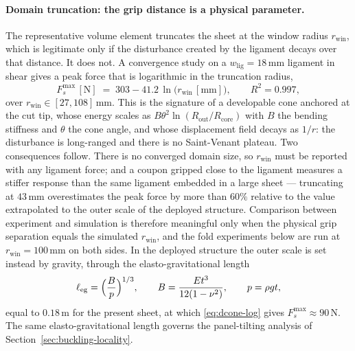 \documentclass[pdflatex,sn-mathphys-num]{sn-jnl}%
\theoremstyle{thmstyleone}%
\theoremstyle{thmstyletwo}%
\theoremstyle{thmstylethree}%
\newcommand{\wlig}{w_{\mathrm{lig}}}
\begin{document}
\paragraph{Domain truncation: the grip distance is a physical parameter.}
The representative volume element truncates the sheet at the window radius
$r_{\mathrm{win}}$, which is legitimate only if the disturbance created by the
ligament decays over that distance. It does not. A convergence study on a
$\wlig=18\,\mathrm{mm}$ ligament in shear gives a peak force that is logarithmic
in the truncation radius,
\begin{equation}
  F_s^{\max}\,[\mathrm{N}] \;=\; 303 - 41.2\,\ln\bigl(r_{\mathrm{win}}\,[\mathrm{mm}]\bigr),
  \qquad R^2=0.997 ,
  \label{eq:dcone-log}
\end{equation}
over $r_{\mathrm{win}}\in[27,108]\,\mathrm{mm}$. This is the signature of a
developable cone anchored at the cut tip, whose energy scales as
$B\theta^2\ln(R_{\mathrm{out}}/R_{\mathrm{core}})$ with $B$ the bending stiffness
and $\theta$ the cone angle, and whose displacement field decays as $1/r$: the
disturbance is long-ranged and there is no Saint-Venant plateau.
Two consequences follow. There is no converged domain size, so $r_{\mathrm{win}}$
must be reported with any ligament force; and a coupon gripped close to the
ligament measures a stiffer response than the same ligament embedded in a large
sheet --- truncating at $43\,\mathrm{mm}$ overestimates the peak force by more
than $60\%$ relative to the value extrapolated to the outer scale of the deployed
structure.
Comparison between experiment and simulation is therefore meaningful only when the
physical grip separation equals the simulated $r_{\mathrm{win}}$, and the fold
experiments below are run at $r_{\mathrm{win}}=100\,\mathrm{mm}$ on both sides. In
the deployed structure the outer scale is set instead by gravity, through the
elasto-gravitational length
\begin{equation}
  \ell_{\mathrm{eg}}=\Bigl(\frac{B}{p}\Bigr)^{1/3},
  \qquad
  B=\frac{E t^{3}}{12(1-\nu^{2})},
  \qquad
  p=\rho g t,
  \label{eq:l-eg}
\end{equation}
equal to $0.18\,\mathrm{m}$ for the present sheet, at which
\eqref{eq:dcone-log} gives $F_s^{\max}\approx90\,\mathrm{N}$. The same
elasto-gravitational length governs the panel-tilting analysis of
Section~\ref{sec:buckling-locality}.
\end{document}
